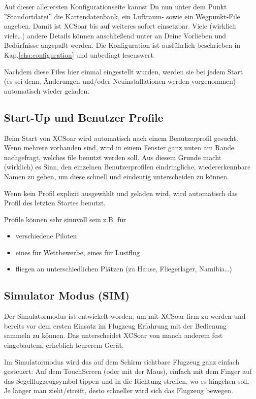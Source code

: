 Auf dieser allerersten Konfigurationseite kannst Du nun unter dem Punkt ''Standortdatei''  die Kartendatenbank, ein Luftraum- sowie ein Wegpunkt-File angeben.
Damit ist {\textsf  XCSoar} bis auf weiteres sofort einsetzbar.
Viele (wirklich viele\dots) andere Details können anschließend unter  an Deine Vorlieben und Bedürfnisse angepaßt werden. 
Die Konfiguration  ist ausführlich beschrieben in Kap.\ref{cha:configuration} und unbedingt lesenswert. 

Nachdem diese Files hier einmal eingestellt wurden, werden sie bei jedem Start (es sei denn, Änderungen und/oder Neuinstallationen werden vorgenommen)
automatisch wieder geladen.

\subsection*{Start-Up und Benutzer Profile}
Beim Start von {\textsf  XCSoar} wird automatisch nach einem Benutzerprofil gesucht. Wenn mehrere vorhanden sind, wird in einem Fenster ganz unten am Rande nachgefragt, welches file benutzt werden soll.
Aus diesem Grunde macht (wirklich) es Sinn, den einzelnen Benutzerprofilen eindringliche, wiedererkennbare Namen zu geben, 
um diese schnell und eindeutig unterscheiden zu können. 

Wenn kein Profil explizit ausgewählt und geladen wird, wird automatisch das Profil des letzten Startes benutzt. 

Profile können sehr sinnvoll sein z.B. für  

\begin{itemize}
\item verschiedene Piloten
\item eines für Wettbewerbe, eines für Lustflug
\item fliegen an unterschiedlichen Plätzen (zu Hause, Fliegerlager, Namibia\dots )
\end{itemize}


\subsection*{Simulator Modus (SIM)}
Der Simulatormodus ist entwickelt worden, um mit {\textsf  XCSoar} firm zu werden und bereits vor dem ersten Einsatz im Flugzeug 
Erfahrung mit der Bedienung sammeln zu können. Das unterscheidet {\textsf  XCSoar} von manch anderem fest eingebautem, erheblich teurerem 
 Gerät. 

Im Simulatormodus wird das auf dem Schirm sichtbare Flugzeug ganz einfach gesteuert:
Auf dem TouchScreen (oder mit der Maus), einfach mit dem Finger auf das Segelflugzeugsymbol tippen und in die Richtung 
streifen, wo es hingehen soll. Je länger man zieht/streift, desto schneller wird sich das Flugzeug bewegen. 

